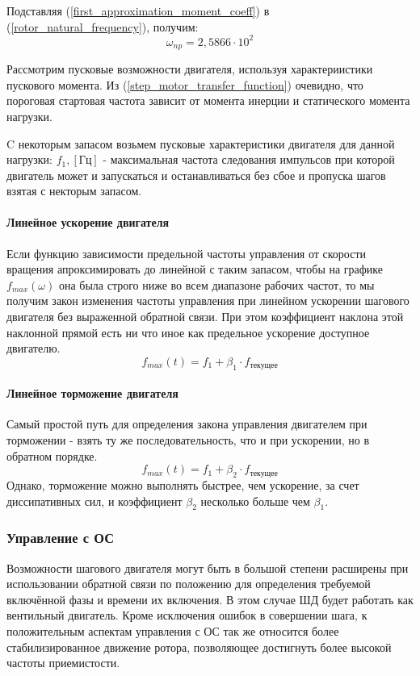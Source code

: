 Подставляя (\ref{first_approximation_moment_coeff}) в (\ref{rotor_natural_frequency}), получим:
\begin{equation}
    \label{first_approximation_rotor_natural_frequency}
    \omega_{np} = 2,5866 \cdot 10^{2}
\end{equation}

Рассмотрим пусковые возможности двигателя, используя характериистики пускового момента. Из
(\ref{step_motor_transfer_function}) очевидно, что пороговая стартовая частота зависит от момента инерции и
статического момента нагрузки.

C некоторым запасом возьмем пусковые характеристики двигателя для данной нагрузки:
$f_{1}, [\textit{Гц}]$ - максимальная частота следования импульсов при которой двигатель может и
запускаться и останавливаться без сбое и пропуска шагов взятая с некторым запасом.

\paragraph{Линейное ускорение двигателя}
Если функцию зависимости предельной частоты управления от скорости вращения апроксимировать до
линейной с таким запасом, чтобы на графике $f_{max}( \omega )$ она была строго ниже во
всем диапазоне рабочих частот, то мы получим закон изменения частоты управления при линейном
ускорении шагового двигателя без выраженной обратной связи. При этом коэффициент наклона этой
наклонной прямой есть ни что иное как предельное ускорение доступное двигателю.
$$
    f_{max}(t) = f_{1} + \beta_{1} \cdot f_{\textit{текущее}}
$$

\paragraph{Линейное торможение двигателя}
Самый простой путь для определения закона управления двигателем при торможении - взять ту же
последовательность, что и при ускорении, но в обратном порядке.
$$
    f_{max}(t) = f_{1} + \beta_{2} \cdot f_{\textit{текущее}}
$$
Однако, торможение можно выполнять быстрее, чем ускорение, за счет диссипативных сил,
и коэффициент $\beta_{2}$ несколько больше чем $\beta_{1}$.

\newpage
\subsubsection{Управление с ОС}
\label{sec_feedback_control}
Возможности шагового двигателя могут быть в большой степени расширены при использовании обратной
связи по положению для определения требуемой включённой фазы и времени их включения. В этом случае ШД
будет работать как вентильный двигатель. Кроме исключения ошибок в совершении шага, к положительным
аспектам управления с ОС так же относится более стабилизированное движение ротора, позволяющее достигнуть
более высокой частоты приемистости.


